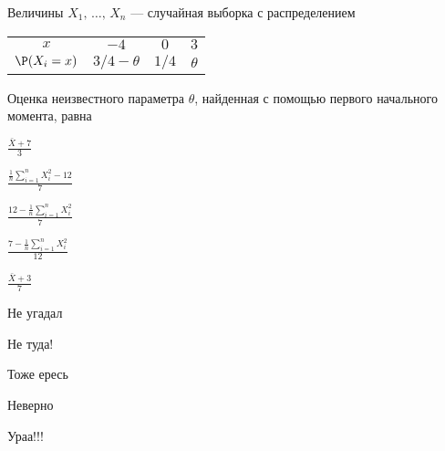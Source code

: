 
\begin{question}
Величины \(X_1, \, \ldots, \, X_n\) — случайная выборка с
распределением

\begin{tabular}{cccc}
\toprule
  $x$                     & $-4$                 & $0$    & $3$         \\
  $\P(X_i=x)$        & $3/4 - \theta$       & $1/4$  & $\theta$    \\
\bottomrule
\end{tabular}

Оценка неизвестного параметра \(\theta\), найденная с помощью первого
начального момента, равна
\begin{answerlist}
  \item \(\frac{\bar X + 7}{3}\)
  \item \(\frac{\frac{1}{n} \sum_{i=1}^{n}X_i^2 - 12}{7}\)
  \item \(\frac{12 - \frac{1}{n} \sum_{i=1}^{n}X_i^2}{7}\)
  \item \(\frac{7 - \frac{1}{n} \sum_{i=1}^{n}X_i^2}{12}\)
  \item \(\frac{\bar X + 3}{7}\)
\end{answerlist}
\end{question}

\begin{solution}
\begin{answerlist}
  \item Не угадал
  \item Не туда!
  \item Тоже ересь
  \item Неверно
  \item Ураа!!!
\end{answerlist}
\end{solution}

